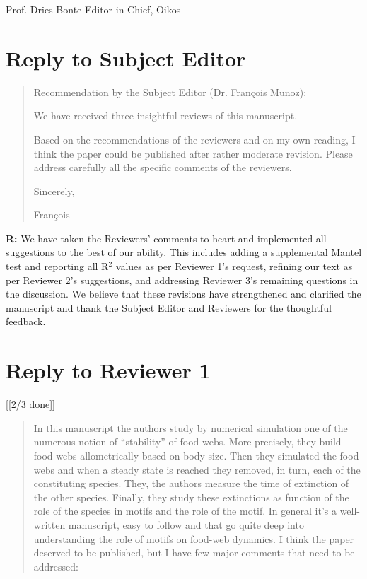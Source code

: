 \documentclass[12pt]{article}
\begin{document}
  Prof. Dries Bonte
  Editor-in-Chief, Oikos


\clearpage

\section*{Reply to Subject Editor}

  \begin{quotation}
    Recommendation by the Subject Editor (Dr. Fran\c{c}ois Munoz):

    We have received three insightful reviews of this manuscript.

    Based on the recommendations of the reviewers and on my own reading, I think the paper could be published after rather moderate revision. Please address carefully all the specific comments of the reviewers.

    Sincerely,

    Fran\c{c}ois
  \end{quotation}

  
  \textbf{R:} We have taken the Reviewers' comments to heart and implemented all suggestions to the best of our ability. This includes adding a supplemental Mantel test and reporting all R$^2$ values as per Reviewer 1's request, refining our text as per Reviewer 2's suggestions, and addressing Reviewer 3's remaining questions in the discussion. We believe that these revisions have strengthened and clarified the manuscript and thank the Subject Editor and Reviewers for the thoughtful feedback.


\clearpage

\section*{Reply to Reviewer 1} [[2/3 done]]

  \begin{quotation}

    In this manuscript the authors study by numerical simulation one of the numerous notion of ``stability'' of food webs. More precisely, they build food webs allometrically based on body size. Then they simulated the food webs and when a steady state is reached they removed, in turn, each of the constituting species. They, the authors measure the time of extinction of the other species. Finally, they study these extinctions as function of the role of the species in motifs and the role of the motif. In general it's a well-written manuscript, easy to follow and that go quite deep into understanding the role of motifs on food-web dynamics. I think the paper deserved to be published, but I have few major comments that need to be addressed:

  \end{quotation}
\end{document}

